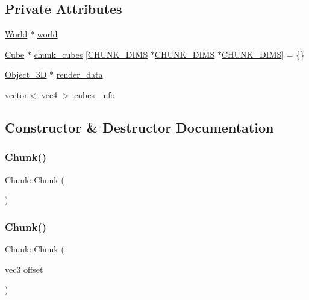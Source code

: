\subsection*{Private Attributes}
\begin{DoxyCompactItemize}
\item 
\mbox{\hyperlink{classWorld}{World}} $\ast$ \mbox{\hyperlink{classChunk_aba16bedd07d267d54c85b3c57cd6ca31}{world}}
\item 
\mbox{\hyperlink{classCube}{Cube}} $\ast$ \mbox{\hyperlink{classChunk_aaf87542e059f3c86960e6f7b5b568daf}{chunk\+\_\+cubes}} \mbox{[}\mbox{\hyperlink{World_8hpp_a0e16b82054c4942f52ca2e1254dcc420}{C\+H\+U\+N\+K\+\_\+\+D\+I\+MS}} $\ast$\mbox{\hyperlink{World_8hpp_a0e16b82054c4942f52ca2e1254dcc420}{C\+H\+U\+N\+K\+\_\+\+D\+I\+MS}} $\ast$\mbox{\hyperlink{World_8hpp_a0e16b82054c4942f52ca2e1254dcc420}{C\+H\+U\+N\+K\+\_\+\+D\+I\+MS}}\mbox{]} = \{\}
\item 
\mbox{\hyperlink{classObject__3D}{Object\+\_\+3D}} $\ast$ \mbox{\hyperlink{classChunk_a76087b66e157921b725b896b5b254fd0}{render\+\_\+data}}
\item 
vector$<$ vec4 $>$ \mbox{\hyperlink{classChunk_acd416e07f98045f3a15354326754cc13}{cubes\+\_\+info}}
\end{DoxyCompactItemize}


\subsection{Constructor \& Destructor Documentation}
\mbox{\label{classChunk_acc32e1562cad6664c98ee07edecdbdf9}} 
\subsubsection{\texorpdfstring{Chunk()}{Chunk()}\hspace{0.1cm}{\footnotesize\ttfamily [1/3]}}
{\footnotesize\ttfamily Chunk\+::\+Chunk (\begin{DoxyParamCaption}{ }\end{DoxyParamCaption})}

\mbox{\label{classChunk_ad48366bd231dc1fe236ddf38e15b40bf}} 
\subsubsection{\texorpdfstring{Chunk()}{Chunk()}\hspace{0.1cm}{\footnotesize\ttfamily [2/3]}}
{\footnotesize\ttfamily Chunk\+::\+Chunk (\begin{DoxyParamCaption}\item[{vec3}]{offset }\end{DoxyParamCaption})}

